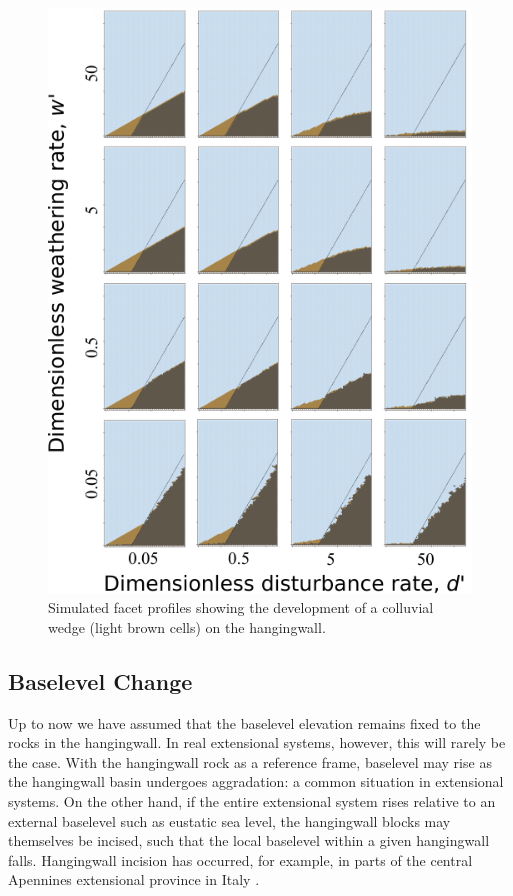 \begin{figure}[ht!]
\centerline{\includegraphics[scale=1.5]{Figures/four_by_four_profiles_colluvial_wedge.pdf}}
\caption{Simulated facet profiles showing the development of a colluvial wedge (light brown cells) on the hangingwall.}
\label{fig:colluv}
\end{figure}


\subsection{Baselevel Change}

Up to now we have assumed that the baselevel elevation remains fixed to the rocks in the hangingwall. In real extensional systems, however, this will rarely be the case. With the hangingwall rock as a reference frame, baselevel may rise as the hangingwall basin undergoes aggradation: a common situation in extensional systems. On the other hand, if the entire extensional system rises relative to an external baselevel such as eustatic sea level, the hangingwall blocks may themselves be incised, such that the local baselevel within a given hangingwall falls. Hangingwall incision has occurred, for example, in parts of the central Apennines extensional province in Italy \citep[e.g.,][]{dagostino2003interactions}.

